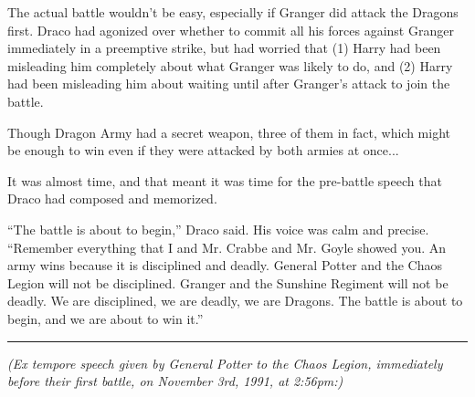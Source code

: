 The actual battle wouldn't be easy, especially if Granger did attack the
Dragons first. Draco had agonized over whether to commit all his forces
against Granger immediately in a preemptive strike, but had worried that
(1) Harry had been misleading him completely about what Granger was
likely to do, and (2) Harry had been misleading him about waiting until
after Granger's attack to join the battle.

Though Dragon Army had a secret weapon, three of them in fact, which
might be enough to win even if they were attacked by both armies at
once...

It was almost time, and that meant it was time for the pre-battle speech
that Draco had composed and memorized.

``The battle is about to begin,'' Draco said. His voice was calm and
precise. ``Remember everything that I and Mr. Crabbe and Mr. Goyle
showed you. An army wins because it is disciplined and deadly. General
Potter and the Chaos Legion will not be disciplined. Granger and the
Sunshine Regiment will not be deadly. We are disciplined, we are deadly,
we are Dragons. The battle is about to begin, and we are about to win
it.''

\begin{center}\rule{3in}{0.4pt}\end{center}

\emph{(Ex tempore speech given by General Potter to the Chaos Legion,
immediately before their first battle, on November 3rd, 1991, at
2:56pm:)}

